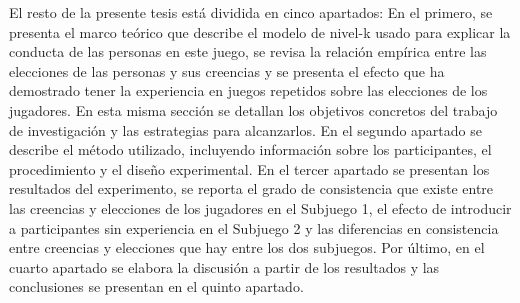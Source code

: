El resto de la presente tesis está dividida en cinco apartados: En el primero, se presenta el marco teórico que describe el modelo de nivel-k usado para explicar la conducta de las personas en este juego, se revisa la relación empírica entre las elecciones de las personas y sus creencias y se presenta el efecto que ha demostrado tener la experiencia en juegos repetidos sobre las elecciones de los jugadores. En esta misma sección se detallan los objetivos concretos del trabajo de investigación y las estrategias para alcanzarlos. En el segundo apartado se describe el método utilizado, incluyendo información sobre los participantes, el procedimiento y el diseño experimental. En el tercer apartado se presentan los resultados del experimento, se reporta el grado de consistencia que existe entre las creencias y elecciones de los jugadores en el Subjuego 1, el efecto de introducir a participantes sin experiencia en el Subjuego 2 y las diferencias en consistencia entre creencias y elecciones que hay entre los dos subjuegos. Por último, en el cuarto apartado se elabora la discusión a partir de los resultados y las conclusiones se presentan en el quinto apartado.\\
